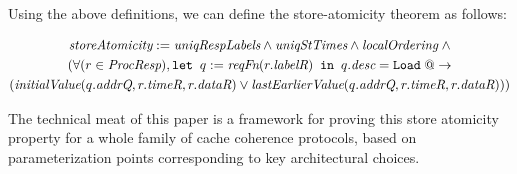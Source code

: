 Using the above definitions, we can define the store-atomicity theorem as follows:
\begin{thm}
\small
\begin{multline*}
\textit{storeAtomicity} := 
\textit{uniqRespLabels} \wedge
\textit{uniqStTimes} \wedge \textit{localOrdering} \; \wedge \\
(\forall (r \in \textit{ProcResp}), \texttt{let } q := \textit{reqFn}(r.\textit{labelR}) \texttt{ in } q.\textit{desc} = \texttt{Load} \; @-> \\
(\textit{initialValue}(q.\textit{addrQ}, r.\textit{timeR}, r.\textit{dataR}) \vee \textit{lastEarlierValue}(q.\textit{addrQ}, r.\textit{timeR}, r.\textit{dataR})))
\end{multline*}
\label{storeAtomicity}
\end{thm}

The technical meat of this paper is a framework for proving this store atomicity
property for a whole family of cache coherence protocols, based on parameterization
points corresponding to key architectural choices.

